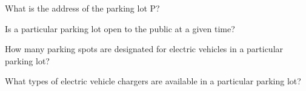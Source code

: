 \label{CQ2.0}\begin{namedbreak}
    What is the address of the parking lot P?
\end{namedbreak}

\begin{namedbreak}
    Is a particular parking lot open to the public at a given time?
\end{namedbreak}

\begin{namedbreak}
    How many parking spots are designated for electric vehicles in a particular parking lot?
\end{namedbreak}

\begin{namedbreak}
    What types of electric vehicle chargers are available in a particular parking lot?
\end{namedbreak}